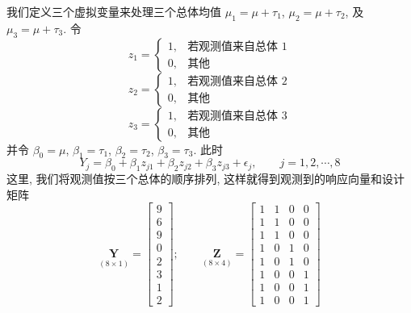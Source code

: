 我们定义三个虚拟变量来处理三个总体均值 $\mu_1=\mu+\tau_1$, $\mu_2=\mu+\tau_2$, 及 $\mu_3=\mu+\tau_3$. 令
\[
z_1=\begin{cases}1,&\text{若观测值来自总体 }1\\0,&\text{其他}\end{cases}
\]
\[
z_2=\begin{cases}1,&\text{若观测值来自总体 }2\\0,&\text{其他}\end{cases}
\]
\[
z_3=\begin{cases}1,&\text{若观测值来自总体 }3\\0,&\text{其他}\end{cases}
\]
并令 $\beta_0=\mu$, $\beta_1=\tau_1$, $\beta_2=\tau_2$, $\beta_3=\tau_3$. 此时
\[
Y_j=\beta_0+\beta_1 z_{j1}+\beta_2 z_{j2}+\beta_3 z_{j3}+\epsilon_j,\qquad j=1,2,\cdots,8
\]
这里, 我们将观测值按三个总体的顺序排列, 这样就得到观测到的响应向量和设计矩阵
\[
\underset{(8\times 1)}{\mathbf{Y}}=\begin{bmatrix}9\\6\\9\\0\\2\\3\\1\\2\end{bmatrix};\qquad
\underset{(8\times 4)}{\mathbf{Z}}=\begin{bmatrix}
1&1&0&0\\
1&1&0&0\\
1&1&0&0\\
1&0&1&0\\
1&0&1&0\\
1&0&0&1\\
1&0&0&1\\
1&0&0&1
\end{bmatrix}
\]
